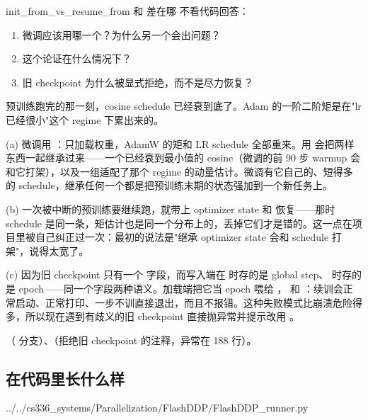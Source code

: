 \begin{checkpoint}{init_from_vs_resume_from}{ 和  差在哪}
不看代码回答：
\begin{enumerate}[label=(\alph*)]
  \item 微调应该用哪一个？为什么另一个会出问题？
  \item 这个论证在什么情况下？
  \item 旧 checkpoint 为什么被显式拒绝，而不是尽力恢复？
\end{enumerate}
\hint 预训练跑完的那一刻，cosine schedule 已经衰到底了。Adam 的一阶二阶矩是在"lr 已经很小"这个 regime 下累出来的。

\ifshowanswers
\tcblower
\answer (a) 微调用 ：只加载权重，AdamW 的矩和 LR schedule 全部重来。用  会把两样东西一起继承过来——一个已经衰到最小值的 cosine（微调的前 90 步 warmup 会和它打架），以及一组适配了那个 regime 的动量估计。微调有它自己的、短得多的 schedule，继承任何一个都是把预训练末期的状态强加到一个新任务上。

(b)  一次被中断的预训练要继续跑，就带上 optimizer state 和  恢复——那时 schedule 是同一条，矩估计也是同一个分布上的，丢掉它们才是错的。这一点在项目里被自己纠正过一次：最初的说法是"继承 optimizer state 会和 schedule 打架"，说得太宽了。

(c) 因为旧 checkpoint 只有一个  字段，而写入端在  时存的是 global step、 时存的是 epoch——同一个字段两种语义。加载端把它当 epoch 喂给 ， 和  ：续训会正常启动、正常打印、一步不训直接退出，而且不报错。这种失败模式比崩溃危险得多，所以现在遇到有歧义的旧 checkpoint 直接抛异常并提示改用 。

\whereincode {}（ 分支）、（拒绝旧 checkpoint 的注释，异常在 188 行）。
\fi
\end{checkpoint}

\subsection{ 在代码里长什么样}
\label{sec:b-sft-initfrom}

%
  {../../cs336_systems/Parallelization/FlashDDP/FlashDDP_runner.py}

